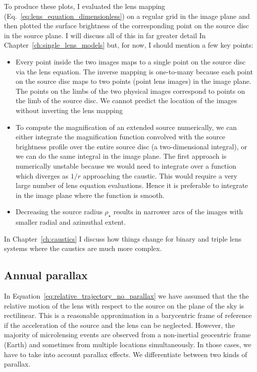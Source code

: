 \documentclass[12pt,dvipsnames]{report}
\begin{document}
To produce these plots, I evaluated the lens mapping
(Eq.~\ref{eq:lens_equation_dimensionless}) on a regular grid in the image plane
and then plotted the surface brightness of the corresponding point on the
source disc in the source plane. I will discuss all of this in far greater
detail In Chapter~\ref{ch:single_lens_models} but, for now, I should mention a
few key points:
\begin{itemize}
    \item Every point inside the two images maps to a single point on the source disc via
          the lens equation. The inverse mapping is one-to-many because each point on the
          source disc maps to two points (point lens images) in the image plane. The
          points on the limbs of the two physical images correspond to points on the limb of
          the source disc. We cannot predict the location of the images without inverting
          the lens mapping
    \item To compute the magnification of an extended source numerically, we can either
          integrate the magnification function convolved with the source brightness
          profile over the entire source disc (a two-dimensional integral), or we can 
          do the same integral in the image plane. The first approach is 
          numerically unstable because we would need to integrate over a function which
          diverges as $1/r$ approaching the caustic. This would require a very large
          number of lens equation evaluations. Hence it is preferable to integrate in
          the image plane where the function is smooth.
    \item Decreasing the source radius $\rho_\star$ results in narrower arcs of the
          images with smaller radial and azimuthal extent.
\end{itemize}
In Chapter~\ref{ch:caustics} I discuss how things change for binary and triple lens 
systems where the caustics are much more complex.

\subsection{Annual parallax}
\label{ssec:single_lens_parallax}
In Equation~\ref{eq:relative_trajectory_no_parallax} we have assumed that the
the relative motion of the lens with respect to the source on the plane of the sky
is rectilinear.
This is a reasonable approximation in a barycentric frame of
reference if the acceleration of the source and the lens can be neglected.
However, the majority of microlensing events are observed from a non-inertial geocentric
frame (Earth) and sometimes from multiple locations simultaneously. In those
cases, we have to take into account parallax effects.
We differentiate between two kinds of parallax. 
\end{document}
